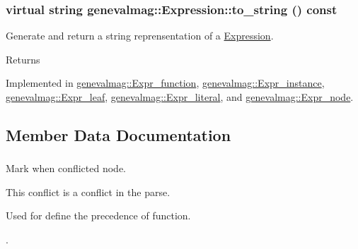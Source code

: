 \hypertarget{classgenevalmag_1_1Expression_a8685f44429501da942b1fe76880af6fe}{
\subsubsection[{to\_\-string}]{\setlength{\rightskip}{0pt plus 5cm}virtual string genevalmag::Expression::to\_\-string () const}}
\label{classgenevalmag_1_1Expression_a8685f44429501da942b1fe76880af6fe}
Generate and return a string reprensentation of a \hyperlink{classgenevalmag_1_1Expression}{Expression}. \begin{DoxyReturn}{Returns}

\end{DoxyReturn}


Implemented in \hyperlink{classgenevalmag_1_1Expr__function_adaaebd5427337bb2288c47a16af804d8}{genevalmag::Expr\_\-function}, \hyperlink{classgenevalmag_1_1Expr__instance_a2186bb2f69173f709cfb75435b32da94}{genevalmag::Expr\_\-instance}, \hyperlink{classgenevalmag_1_1Expr__leaf_a96854f59a155b173b6e79007d87bdad5}{genevalmag::Expr\_\-leaf}, \hyperlink{classgenevalmag_1_1Expr__literal_a2e023f432f0a46b75f65cb0e36ac6583}{genevalmag::Expr\_\-literal}, and \hyperlink{classgenevalmag_1_1Expr__node_adea1d8fbc1b01f018e18cedad871f6a7}{genevalmag::Expr\_\-node}.



\subsection{Member Data Documentation}
\hypertarget{classgenevalmag_1_1Expression_a2770b2edf303704e36bfecfea77fb177}{
\subsubsection[{conflict}]{}}
\label{classgenevalmag_1_1Expression_a2770b2edf303704e36bfecfea77fb177}


Mark when conflicted node.\par
 This conflict is a conflict in the parse.\par
 Used for define the precedence of function.\par
. 



